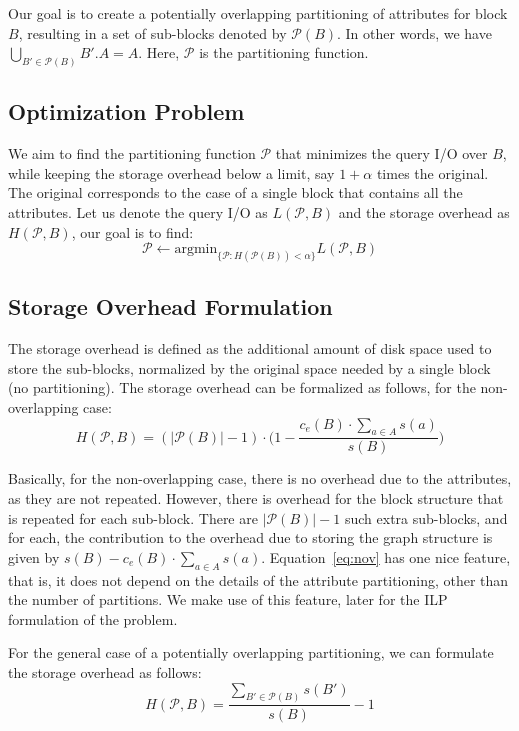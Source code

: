 Our goal is to create a potentially overlapping partitioning of attributes for
block $B$, resulting in a set of sub-blocks denoted by $\mathcal{P}(B)$. In
other words, we have $\bigcup_{B'\in \mathcal{P}(B)} B'.A = A$. Here,
$\mathcal{P}$ is the partitioning function.

\subsection{Optimization Problem}
\noindent
We aim to find the partitioning function $\mathcal{P}$ that minimizes the query
I/O over $B$, while keeping the storage overhead below a limit, say
$1+\alpha$ times the original. The original corresponds to the case of a single
block that contains all the attributes. Let us denote the query I/O as
$L(\mathcal{P}, B)$ and the storage overhead as $H(\mathcal{P}, B)$,
our goal is to find: 
\begin{equation} 
\mathcal{P} \leftarrow \mbox{argmin}_{\{\mathcal{P}: H(\mathcal{P}(B)) < \alpha\}} L(\mathcal{P},B)
\end{equation}

\subsection{Storage Overhead Formulation}
\noindent
The storage overhead is defined as the additional amount of disk space used to
store the sub-blocks, normalized by the original space needed by a single
block (no partitioning). The storage overhead can be formalized as follows,
for the non-overlapping case:
\begin{equation}
H(\mathcal{P}, B) = (|\mathcal{P}(B)|-1)\cdot\Big(1-\frac{c_e(B)\cdot \sum_{a\in A} s(a)}{s(B)}\Big)
\label{eq:nov}
\end{equation}

Basically, for the non-overlapping case, there is no overhead due to the
attributes, as they are not repeated. However, there is overhead for the block
structure that is repeated for each sub-block. There are $|\mathcal{P}(B)|-1$
such extra sub-blocks, and for each, the contribution to the overhead due to
storing the graph structure is given by $s(B)-c_e(B)\cdot \sum_{a\in A} s(a)$.
Equation~\ref{eq:nov} has one nice feature, that is, it does not depend on the
details of the attribute partitioning, other than the number of partitions. We
make use of this feature, later for the ILP formulation of the problem.

For the general case of a potentially overlapping partitioning, we can
formulate the storage overhead as follows:
\begin{equation}
H(\mathcal{P}, B) = \frac{\sum_{B'\in \mathcal{P}(B)} s(B')}{s(B)} - 1 
\end{equation}

